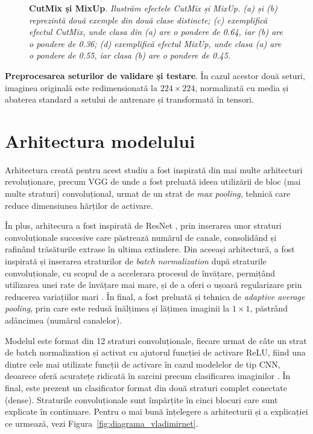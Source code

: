 \begin{figure}[H]
  \caption[CutMix și MixUp]{\textbf{CutMix și MixUp}. \textit{Ilustrăm efectele CutMix și MixUp. (a) și (b) reprezintă două exemple din două clase distincte; (c) exemplifică efectul CutMix, unde clasa din (a) are o pondere de 0.64, iar (b) are o pondere de 0.36; (d) exemplifică efectul MixUp, unde clasa (a) are o pondere de 0.55, iar clasa (b) are o pondere de 0.45.}}
  \label{fig:exemplu_efecte_avansate}
\end{figure}

\textbf{Preprocesarea seturilor de validare și testare}. În cazul acestor două seturi, imaginea originală este redimensionată 
la $224 \times 224$, normalizată cu media și abaterea standard a setului de antrenare și transformată în tensori.

\section{Arhitectura modelului}

Arhitectura creată pentru acest studiu a fost inspirată din mai multe arhitecturi revoluționare, precum VGG \cite{vggnet} de unde a fost preluată ideea utilizării de bloc (mai multe straturi) convoluțional, urmat de un strat de \textit{max pooling}, tehnică care reduce dimensiunea hărților de activare.

În plus, arhitecura a fost inspirată de ResNet \cite{resnet}, prin inserarea unor straturi convoluționale succesive care păstrează numărul de canale, consolidând și rafinând trăsăturile extrase în ultima extindere. Din aceeași arhitectură, a fost inspirată și inserarea straturilor de \textit{batch normalization} după straturile convoluționale, cu scopul de a accelerara procesul de învățare, permițând utilizarea unei rate de învățare mai mare, și de a oferi o ușoară regularizare prin reducerea variațiilor
mari \cite{batch_norm}. În final, a fost preluată și tehnica de \textit{adaptive average pooling}, prin care este redusă înălțimea și lățimea imaginii la $1\times1$, păstrând adâncimea (numărul canalelor).

Modelul este format din 12 straturi convoluționale, fiecare urmat de câte un strat de batch normalization și activat cu ajutorul funcției de activare ReLU, fiind una dintre cele mai utilizate funcții de activare în cazul modelelor de tip CNN, deoarece oferă acuratețe ridicată în sarcini precum clasificarea imaginilor \cite{relu1, relu2}. În final, este prezent un clasificator format din două straturi complet conectate (dense). Straturile convoluționale sunt împărțite în cinci blocuri care sunt explicate în continuare. Pentru o mai bună înțelegere a arhitecturii și a explicației ce urmează, vezi Figura~\ref{fig:diagrama_vladimirnet}.

